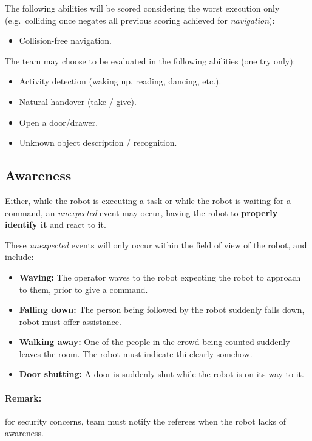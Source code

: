 The following abilities will be scored considering the worst execution only (e.g.~colliding once negates all previous scoring achieved for \textit{navigation}):

\begin{itemize}
	\item Collision-free navigation.
\end{itemize}


The team may choose to be evaluated in the following abilities (one try only):
\begin{itemize}
	\item Activity detection (waking up, reading, dancing, etc.).
	\item Natural handover (take / give).
	\item Open a door/drawer.
	\item Unknown object description / recognition.
\end{itemize}

\subsection{Awareness}
\label{sec:eegpsr-awarenes}
Either, while the robot is executing a task or while the robot is waiting for a command, an \textit{unexpected} event may occur, having the robot to \textbf{properly identify it} and react to it.

These \textit{unexpected} events will only occur within the field of view of the robot, and include:
\begin{itemize}
	\item \textbf{Waving:} The operator waves to the robot expecting the robot to approach to them, prior to give a command.
	\item \textbf{Falling down:} The person being followed by the robot suddenly falls down, robot must offer assistance.
	\item \textbf{Walking away:} One of the people in the crowd being counted suddenly leaves the room. The robot must indicate thi clearly somehow. 
	\item \textbf{Door shutting:} A door is suddenly shut while the robot is on its way to it.
\end{itemize}

\paragraph*{Remark:} for security concerns, team must notify the referees when the robot lacks of awareness.


